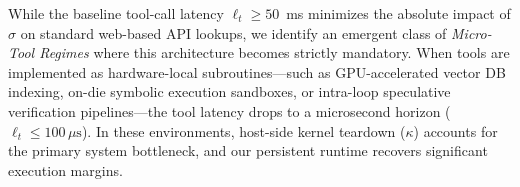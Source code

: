 While the baseline tool-call latency $\ell_t \ge 50$~ms minimizes the absolute impact of $\sigma$ on standard web-based API lookups, we identify an emergent class of \textit{Micro-Tool Regimes} where this architecture becomes strictly mandatory. When tools are implemented as hardware-local subroutines—such as GPU-accelerated vector DB indexing, on-die symbolic execution sandboxes, or intra-loop speculative verification pipelines—the tool latency drops to a microsecond horizon ($\ell_t \le 100\,\mu\text{s}$). In these environments, host-side kernel teardown ($\kappa$) accounts for the primary system bottleneck, and our persistent runtime recovers significant execution margins.
